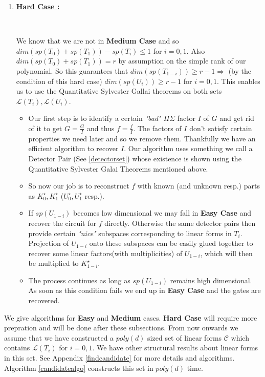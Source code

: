 \documentclass[letterpaper,USenglish,numberwithinsect]{lipics}
\newcommand{\ML}{\mathcal{L}}
\newcommand{\MC}{\mathcal{C}}
\begin{document}
\begin{enumerate}
\item \underline{\bf Hard Case :}
  \centerline{\fbox{ $\ML(T_{1-i}) \subseteq sp(U_{i}),$ for $i=0$ and
$1$ :}\\}

    We know that we are not in {\bf Medium Case} and so
$dim(sp(T_0)+
sp(T_1)) - sp(T_i)\leq 1$  for $i=0,1$. Also $dim(sp(T_0)+ sp(T_1)) = r$ by
assumption on the simple rank of our polynomial.
    So this guarantees that $dim(sp(T_{1-i})) \geq r-1 \Rightarrow$ (by the
condition of this hard case) $dim(sp(U_i))
\geq r-1$ for $i=0,1$. This enables us to use the Quantitative
Sylvester Gallai theorems on both sets $\ML(T_i), \ML(U_i)$.
\begin{itemize}
\item Our first step is to identify a certain \emph{"bad"} $\Pi\Sigma$
    factor $I$ of $G$ and get rid of it to get $G = \frac{G}{I}$ and thus $f=\frac{f}{I}$. The factors of $I$ don't satisfy certain properties
    we need later and so we remove them. Thankfully we have an efficient algorithm to recover $I$.
    Our algorithm uses something we call a Detector Pair (See \ref{detectorset}) whose existence is shown
    using the Quantitative Sylvester Galai Theorems mentioned above.
\item So now our job is to reconstruct $f$
    with known (and unknown resp.) parts as $K_0^\star,K_1^\star$ ($U_0^\star,U_1^\star$ resp.).

\item If $sp(U_{1-i})$ becomes low dimensional we may fall in {\bf Easy Case} and
    recover the circuit for $f$ directly. Otherwise the same detector pairs then provide certain \emph{"nice"}
    subspaces corresponding to linear forms in $T_{i}$.
    Projection of $U_{1-i}$ onto these subspaces can be easily glued together to recover some linear factors(with multiplicities) of
    $U_{1-i}$, which will then be multiplied to $K_{1-i}^\star$.
\item The
process continues as long as $sp(U_{1-i})$ remains high dimensional. As soon
as this condition fails we end up in {\bf Easy Case } and the gates are recovered.
\end{itemize}
    \end{enumerate}





We give algorithms for {\bf Easy} and {\bf Medium} cases. {\bf Hard Case} will require more  prepration and will be done after these subsections. From now onwards
we assume that we have constructed a $poly(d)$ sized set of linear forms $\MC$ which contains $\ML(T_i)$ for $i=0,1$. We have other structural results about linear forms
in this set. See Appendix \ref{findcandidate} for more details and algorithms. Algorithm \ref{candidatealgo} constructs this set in $poly(d)$ time.
\end{document}
